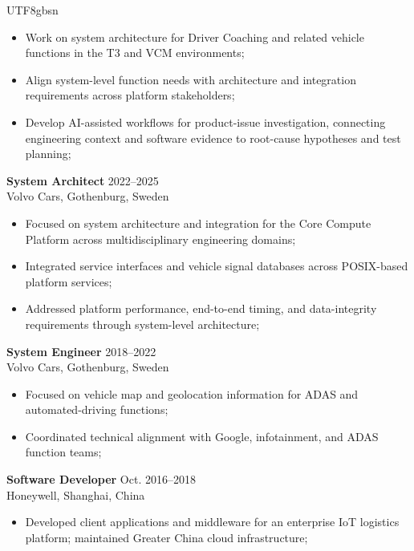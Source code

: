 \documentclass[margin, 10pt]{res} %
\begin{document}
\begin{resume}
\begin{CJK}{UTF8}{gbsn}
\begin{itemize} \itemsep -2pt %
\item Work on system architecture for Driver Coaching and related vehicle functions in the T3 and VCM environments;
\item Align system-level function needs with architecture and integration requirements across platform stakeholders;
\item Develop AI-assisted workflows for product-issue investigation, connecting engineering context and software evidence to root-cause hypotheses and test planning;
\end{itemize}

\textbf{System Architect} \hfill 2022–2025 \\
Volvo Cars, Gothenburg, Sweden

\begin{itemize} \itemsep -2pt %
\item Focused on system architecture and integration for the Core Compute Platform across multidisciplinary engineering domains;
\item Integrated service interfaces and vehicle signal databases across POSIX-based platform services;
\item Addressed platform performance, end-to-end timing, and data-integrity requirements through system-level architecture;
\end{itemize}

\textbf{System Engineer} \hfill 2018–2022 \\
Volvo Cars, Gothenburg, Sweden

\begin{itemize} \itemsep -2pt %
\item Focused on vehicle map and geolocation information for ADAS and automated-driving functions;
\item Coordinated technical alignment with Google, infotainment, and ADAS function teams;
\end{itemize}

\textbf{Software Developer} \hfill Oct. 2016–2018 \\
Honeywell, Shanghai, China

\begin{itemize} \itemsep -2pt %
\item Developed client applications and middleware for an enterprise IoT logistics platform; maintained Greater China cloud infrastructure;
\end{itemize}


\end{CJK}
\end{resume}
\end{document}
